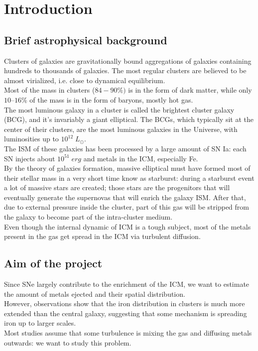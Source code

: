 \documentclass{article}
\begin{document}
\section{Introduction}
\subsection{Brief astrophysical background}
Clusters of galaxies are gravitationally bound aggregations of
galaxies containing hundreds to thousands of galaxies. The most regular clusters are believed to be almost virialized, i.e. close to dynamical equilibrium.\\
Most of the mass in clusters (\(84-90\% )\) is in the form of dark matter, while only \(10–16\%\) of the mass is in the form of baryons, mostly hot gas. \\
The most luminous galaxy in a cluster is called the brightest cluster galaxy (BCG), and it's invariably a giant elliptical. The BCGs, which typically sit at the center of their clusters, are the most luminous galaxies in the Universe, with luminosities up to \(10^{12}\;L_{\odot}\). \\
The ISM of these galaxies has been processed by a large amount of SN Ia: each SN injects about  \(10^{51} \; erg\) and metals in the ICM, especially Fe.\\ By the theory of galaxies formation, massive elliptical must have formed most of their stellar mass in a very short time know as starburst: during a starburst event a lot of massive stars are created; those stars are the progenitors that will eventually generate the supernovas that will enrich the galaxy ISM. After that, due to external pressure inside the cluster, part of this gas will be stripped from the galaxy to become part of the intra-cluster medium.\\ Even though the internal dynamic of ICM is a tough subject, most of the metals present in the gas get spread in the ICM via turbulent diffusion.

\subsection{Aim of the project}
Since SNe largely contribute to the enrichment of the ICM, we want to estimate the amount of metals ejected and their spatial distribution.\\
However, observations show that the iron distribution in clusters is much more extended than the central galaxy, suggesting that some mechanism is spreading iron up to larger scales.\\
Most studies assume that some turbulence is mixing the gas and diffusing metals outwards: we want to study this problem.
\end{document}

